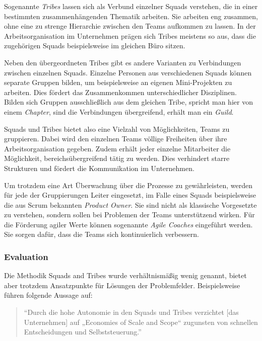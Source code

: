 Sogenannte \textit{Tribes} lassen sich als Verbund einzelner Squads verstehen, die in einer bestimmten zusammenhängenden Thematik arbeiten. Sie arbeiten eng zusammen, ohne eine zu strenge Hierarchie zwischen den Teams aufkommen zu lassen. In der Arbeitsorganisation im Unternehmen prägen sich Tribes meistens so aus, dass die zugehörigen Squads beispielsweise im gleichen Büro sitzen.  \cite[S. 3]{kniberg_scaling_2012}

Neben den übergeordneten Tribes gibt es andere Varianten zu Verbindungen zwischen einzelnen Squads. Einzelne Personen aus verschiedenen Squads können separate Gruppen bilden, um beispielsweise an eigenen Mini-Projekten zu arbeiten. Dies fördert das Zusammenkommen unterschiedlicher Disziplinen. Bilden sich Gruppen ausschließlich aus dem gleichen Tribe, spricht man hier von einem \textit{Chapter}, sind die Verbindungen übergreifend, erhält man ein \textit{Guild}. \cite[S. 9f.]{kniberg_scaling_2012}

Squads und Tribes bietet also eine Vielzahl von Möglichkeiten, Teams zu gruppieren. Dabei wird den einzelnen Teams völlige Freiheiten über ihre Arbeitsorganisation gegeben. Zudem erhält jeder einzelne Mitarbeiter die Möglichkeit, bereichsübergreifend tätig zu werden. Dies verhindert starre Strukturen und fördert die Kommunikation im Unternehmen. 

Um trotzdem eine Art Überwachung über die Prozesse zu gewährleisten, werden für jede der Gruppierungen Leiter eingesetzt, im Falle eines Squads beispielsweise die aus Scrum bekannten \textit{Product Owner}. Sie sind nicht als klassische Vorgesetzte zu verstehen, sondern sollen bei Problemen der Teams unterstützend wirken. Für die Förderung agiler Werte können sogenannte \textit{Agile  Coaches} eingeführt werden. Sie sorgen dafür, dass die Teams sich kontinuierlich verbessern. \cite[S. 4]{kniberg_scaling_2012}

\subsubsection{Evaluation}

Die Methodik Squads and Tribes wurde verhältnismäßig wenig  genannt, bietet aber trotzdem Ansatzpunkte für Lösungen der Problemfelder. Beispielsweise führen  folgende Aussage auf:

\begin{quote}
	``Durch die hohe Autonomie in den Squads und Tribes verzichtet [das Unternehmen] auf „Economies of Scale and Scope“ zugunsten von schnellen Entscheidungen und Selbststeuerung.'' \cite[S. 98]{heinemann_digitale_2016}
\end{quote}

